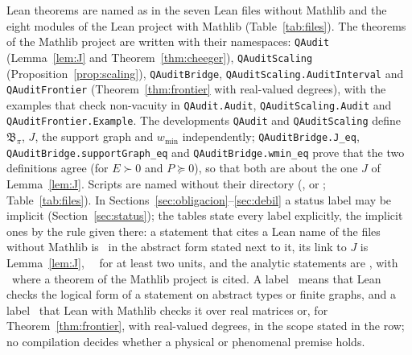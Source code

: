 Lean theorems are named as in the seven Lean files without Mathlib and the eight modules of the Lean project with Mathlib (Table~\ref{tab:files}). The theorems of the Mathlib project are written with their namespaces: \texttt{QAudit} (Lemma~\ref{lem:J} and Theorem~\ref{thm:cheeger}), \texttt{QAuditScaling} (Proposition~\ref{prop:scaling}), \texttt{QAuditBridge}, \texttt{QAuditScaling.\allowbreak AuditInterval} and \texttt{QAuditFrontier} (Theorem~\ref{thm:frontier} with real-valued degrees), with the examples that check non-vacuity in \texttt{QAudit.\allowbreak Audit}, \texttt{QAuditScaling.\allowbreak Audit} and \texttt{QAuditFrontier.\allowbreak Example}. The developments \texttt{QAudit} and \texttt{QAuditScaling} define $\mathfrak B_\pi$, $J$, the support graph and $w_{\min}$ independently; \texttt{QAuditBridge.\allowbreak J\_eq}, \texttt{QAuditBridge.\allowbreak supportGraph\_eq} and \texttt{QAuditBridge.\allowbreak wmin\_eq} prove that the two definitions agree (for $E\succ0$ and $P\succeq0$), so that both are about the one $J$ of Lemma~\ref{lem:J}. Scripts are named without their directory (,  or ; Table~\ref{tab:files}). In Sections~\ref{sec:obligacion}--\ref{sec:debil} a status label may be implicit (Section~\ref{sec:status}); the tables state every label explicitly, the implicit ones by the rule given there: a statement that cites a Lean name of the files without Mathlib is \stL\ in the abstract form stated next to it, its link to $J$ is Lemma~\ref{lem:J}, \stA\ \stM\ for at least two units, and the analytic statements are \stA, with \stM\ where a theorem of the Mathlib project is cited. A label \stL\ means that Lean checks the logical form of a statement on abstract types or finite graphs, and a label \stM\ that Lean with Mathlib checks it over real matrices or, for Theorem~\ref{thm:frontier}, with real-valued degrees, in the scope stated in the row; no compilation decides whether a physical or phenomenal premise holds.

